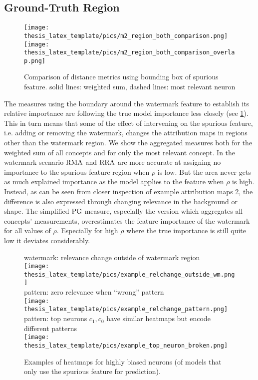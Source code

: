 \subsection{Ground-Truth Region}

\begin{figure}[ht!]
\centering
    \texttt{[image: thesis\_latex\_template/pics/m2\_region\_both\_comparison.png]}
    \texttt{[image: thesis\_latex\_template/pics/m2\_region\_both\_comparison\_overlap.png]}
    \caption[Region Specific, Comparison of Metrics]{Comparison of distance metrics using bounding box of spurious feature. solid lines: weighted sum, dashed lines: most relevant neuron}
    \label{fig:m2_region_comparison}
\end{figure}

The measures using the boundary around the watermark feature to establish its relative importance are following the true model importance less closely (see \cref{fig:m2_region_comparison}). 
This in turn means that some of the effect of intervening on the spurious feature, i.e. adding or removing the watermark, changes the attribution maps in regions other than the watermark region. We show the aggregated measures both for the weighted sum of all concepts and for only the most relevant concept. 
In the watermark scenario $\operatorname*{RMA}$ and $\operatorname*{RRA}$ are more accurate at assigning no importance to the spurious feature region when $\rho$ is low. But the area never gets as much explained importance as the model applies to the feature when $\rho$ is high. Instead, as can be seen from closer inspection of example attribution maps \cref{fig:example_relchange_outside_wm}, the difference is also expressed through changing relevance in the background or shape. 
The simplified $\operatorname*{PG}$ measure, especially the version which aggregates all concepts' measurements, overestimates the feature importance of the watermark for all values of $\rho$. Especially for high $\rho$ where the true importance is still quite low it deviates considerably.

\begin{figure}[t!]
    \centering
    watermark: relevance change outside of watermark region\\
    \texttt{[image: thesis\_latex\_template/pics/example\_relchange\_outside\_wm.png]}\\
    pattern: zero relevance when ``wrong'' pattern\\
    \texttt{[image: thesis\_latex\_template/pics/example\_relchange\_pattern.png]}\\
    pattern: top neurons $c_1, c_0$ have similar heatmaps but encode different patterns\\
    \texttt{[image: thesis\_latex\_template/pics/example\_top\_neuron\_broken.png]}
    \caption[Examples for Heatmap Artifacts]{Examples of heatmaps for highly biased neurons (of models that only use the spurious feature for prediction). }
    \label{fig:example_relchange_outside_wm}
\end{figure}

